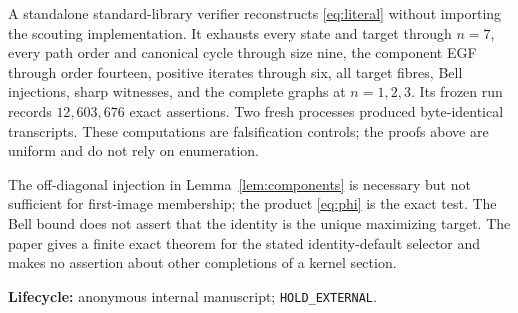 \documentclass[a4paper,10pt]{amsart}
\theoremstyle{remark}
\begin{document}
A standalone standard-library verifier reconstructs \eqref{eq:literal}
without importing the scouting implementation.  It exhausts every state
and target through $n=7$, every path order and canonical cycle through size
nine, the component EGF through order fourteen, positive iterates through
six, all target fibres, Bell injections, sharp witnesses, and the complete
graphs at $n=1,2,3$.  Its frozen run records $12{,}603{,}676$ exact
assertions.  Two fresh processes produced byte-identical transcripts.
These computations are falsification controls; the proofs above are
uniform and do not rely on enumeration.

The off-diagonal injection in Lemma~\ref{lem:components} is necessary but
not sufficient for first-image membership; the product
\eqref{eq:phi} is the exact test.  The Bell bound does not assert that the
identity is the unique maximizing target.  The paper gives a finite exact
theorem for the stated identity-default selector and makes no assertion
about other completions of a kernel section.

\medskip
\noindent\textbf{Lifecycle:} anonymous internal manuscript;
\texttt{HOLD\_EXTERNAL}.



\end{document}
